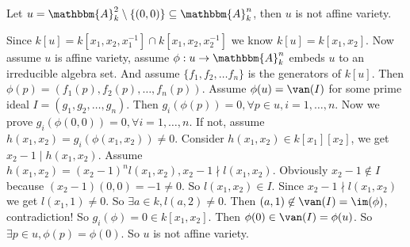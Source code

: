 \documentclass{ctexart}
\newcommand{\A}{\mathbbm{A}}
\begin{document}
\begin{problem}
Let \(u=\A_k^2 \setminus \{(0,0)\}\subseteq \A_k^n\),
then \(u\) is not affine variety.
\end{problem}
\begin{solution}
	Since \(k[u]=k[x_1,x_2,x_1^{-1}]\cap k[x_1,x_2,x_2^{-1}] \) we know \(k[u ]=k[x_1,x_2]\).
	Now assume \(u \) is affine variety, assume \(\phi:u \to \A_k^n \) embeds \(u \) to an irreducible algebra set.
	And assume \(\{f_1,f_2,\dots f_n\}\) is the generators of \(k[u]\).
	Then \(\phi(p)=(f_1(p),f_2(p),\dots,f_n(p))\).
	Assume \(\phi(u)=\van(I)\) for some prime ideal \(I=(g_1,g_2,\dots,g_n)\).
	Then \(g_i(\phi(p))=0,\forall p \in u,i=1,\dots,n\).
	Now we prove \(g_i(\phi(0,0))=0,\forall i=1,\dots ,n\).
	If not, assume
	\(h(x_1,x_2)=g_i(\phi(x_1,x_2))\neq 0\).
	Consider \(h(x_1,x_2)\in k[x_1][x_2]\), we get \(x_2-1 \mid h(x_1,x_2)\).
	Assume \(h(x_1,x_2)=(x_2-1)^n l(x_1,x_2), x_2-1 \nmid l(x_1,x_2)\).
	Obviously \(x_2-1 \notin I\) because \((x_2-1)(0,0)=-1\neq 0\).
	So \(l(x_1,x_2)\in I\). Since \(x_2-1 \nmid l(x_1,x_2)\) we get \(l(x_1,1)\neq 0\).
	So \(\exists a \in k, l(a,2)\neq 0\). Then \((a,1)\not\in \van(I)=\im(\phi)\),
	contradiction!
	So \(g_i(\phi)=0\in k[x_1,x_2]\). Then \(\phi(0)\in \van(I)=\phi(u)\).
	So \(\exists p\in u, \phi(p)=\phi(0)\).
	So \(u\) is not affine variety.
\end{solution}
\begin{problem}

\end{problem}
\end{document}
